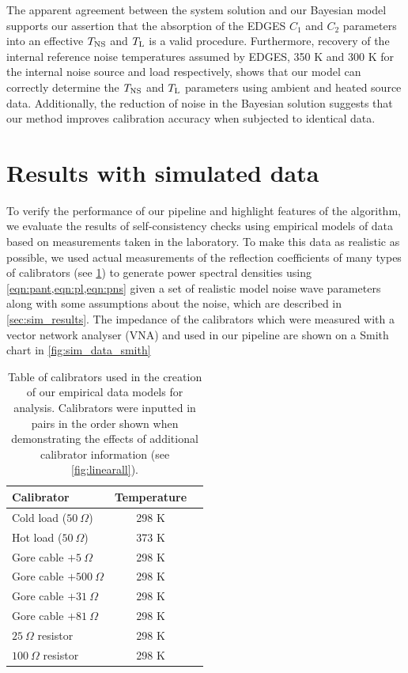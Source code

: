 The apparent agreement between the system solution and our Bayesian model supports our assertion that the absorption of the EDGES $C_1$ and $C_2$ parameters into an effective $T_{\mathrm{NS}}$ and $T_{\mathrm{L}}$ is a valid procedure. Furthermore, recovery of the internal reference noise temperatures assumed by EDGES, 350 K and 300 K for the internal noise source and load respectively, shows that our model can correctly determine the $T_{\mathrm{NS}}$ and $T_{\mathrm{L}}$ parameters using ambient and heated source data. Additionally, the reduction of noise in the Bayesian solution suggests that our method improves calibration accuracy when subjected to identical data. 


\section{Results with simulated data}\label{sec:simulated_data}
To verify the performance of our pipeline and highlight features of the algorithm, we evaluate the results of self-consistency checks using empirical models of data based on measurements taken in the laboratory. To make this data as realistic as possible, we used actual measurements of the reflection coefficients of many types of calibrators (see \cref{tab:sim_calibrators}) to generate power spectral densities using \cref{eqn:pant,eqn:pl,eqn:pns} given a set of realistic model noise wave parameters along with some assumptions about the noise, which are described in \cref{sec:sim_results}. The impedance of the calibrators which were measured with a vector network analyser (VNA) and used in our pipeline are shown on a Smith chart in \cref{fig:sim_data_smith}
\begin{table}
    \centering
    \begin{tabular}{lcc}
    \hline
    Calibrator & Temperature\\
    \hline
    Cold load ($50 \ \Omega$) & 298 K\\
    Hot load ($50 \ \Omega$) & 373 K\\
    Gore cable $+ 5 \ \Omega$ & 298 K\\
    Gore cable $+ 500 \ \Omega$ & 298 K\\
    Gore cable $+ 31 \ \Omega$ & 298 K\\
    Gore cable $+ 81 \ \Omega$ & 298 K\\
    $25 \ \Omega$ resistor & 298 K\\
    $100 \ \Omega$ resistor & 298 K\\
    \hline
    \end{tabular}
    \caption{Table of calibrators used in the creation of our empirical data models for analysis. Calibrators were inputted in pairs in the order shown when demonstrating the effects of additional calibrator information (see \cref{fig:linearall}).}
    \label{tab:sim_calibrators}
\end{table}

